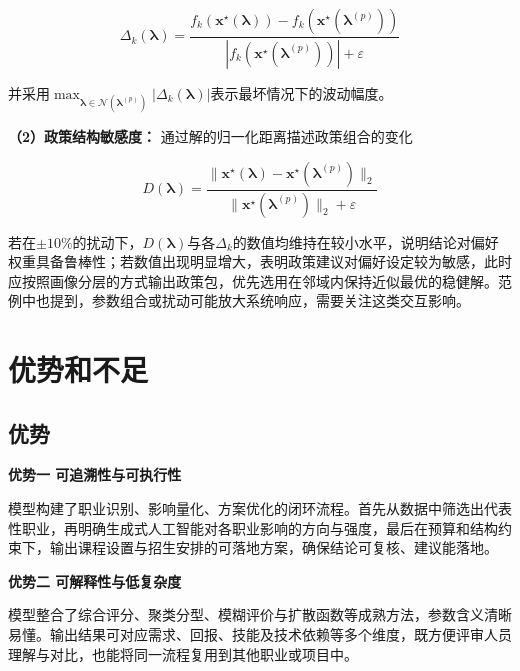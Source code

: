 \documentclass{mcmthesis}
\begin{document}
\begin{equation}
\Delta_k(\boldsymbol{\lambda})=\frac{f_k(\mathbf{x}^\star(\boldsymbol{\lambda}))-f_k(\mathbf{x}^\star(\boldsymbol{\lambda}^{(p)}))}{\left|f_k(\mathbf{x}^\star(\boldsymbol{\lambda}^{(p)}))\right|+\varepsilon}
\end{equation}

\noindent 并采用$\max_{\boldsymbol{\lambda}\in\mathcal{N}(\boldsymbol{\lambda}^{(p)})}|\Delta_k(\boldsymbol{\lambda})|$表示最坏情况下的波动幅度。

\noindent\textbf{（2）政策结构敏感度：} 通过解的归一化距离描述政策组合的变化

\begin{equation} 
 D(\boldsymbol{\lambda})=\frac{\|\mathbf{x}^\star(\boldsymbol{\lambda})-\mathbf{x}^\star(\boldsymbol{\lambda}^{(p)})\|_2}{\|\mathbf{x}^\star(\boldsymbol{\lambda}^{(p)})\|_2+\varepsilon}
\end{equation}

\noindent 若在$\pm10\%$的扰动下，$D(\boldsymbol{\lambda})$与各$\Delta_k$的数值均维持在较小水平，说明结论对偏好权重具备鲁棒性；若数值出现明显增大，表明政策建议对偏好设定较为敏感，此时应按照画像分层的方式输出政策包，优先选用在邻域内保持近似最优的稳健解。范例中也提到，参数组合或扰动可能放大系统响应，需要关注这类交互影响。



\section{优势和不足}
\subsection{优势}
\noindent\textbf{优势一 可追溯性与可执行性}

模型构建了职业识别、影响量化、方案优化的闭环流程。首先从数据中筛选出代表性职业，再明确生成式人工智能对各职业影响的方向与强度，最后在预算和结构约束下，输出课程设置与招生安排的可落地方案，确保结论可复核、建议能落地。

\medskip

\noindent\textbf{优势二 可解释性与低复杂度}

模型整合了综合评分、聚类分型、模糊评价与扩散函数等成熟方法，参数含义清晰易懂。输出结果可对应需求、回报、技能及技术依赖等多个维度，既方便评审人员理解与对比，也能将同一流程复用到其他职业或项目中。
\end{document}
